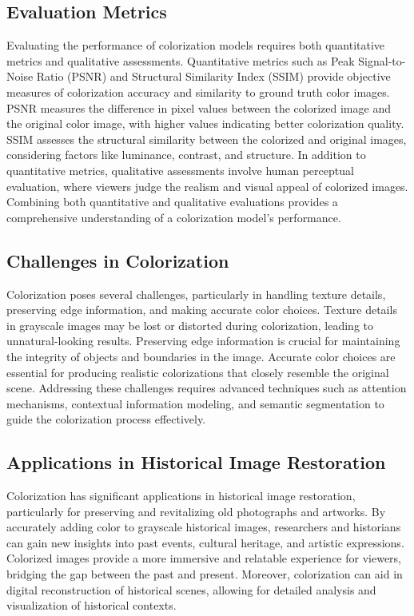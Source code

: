\subsection*{Evaluation Metrics}

Evaluating the performance of colorization models requires both quantitative metrics and qualitative assessments. Quantitative metrics such as Peak Signal-to-Noise Ratio (PSNR) and Structural Similarity Index (SSIM) provide objective measures of colorization accuracy and similarity to ground truth color images. PSNR measures the difference in pixel values between the colorized image and the original color image, with higher values indicating better colorization quality. SSIM assesses the structural similarity between the colorized and original images, considering factors like luminance, contrast, and structure. In addition to quantitative metrics, qualitative assessments involve human perceptual evaluation, where viewers judge the realism and visual appeal of colorized images. Combining both quantitative and qualitative evaluations provides a comprehensive understanding of a colorization model's performance.

\subsection*{Challenges in Colorization}

Colorization poses several challenges, particularly in handling texture details, preserving edge information, and making accurate color choices. Texture details in grayscale images may be lost or distorted during colorization, leading to unnatural-looking results. Preserving edge information is crucial for maintaining the integrity of objects and boundaries in the image. Accurate color choices are essential for producing realistic colorizations that closely resemble the original scene. Addressing these challenges requires advanced techniques such as attention mechanisms, contextual information modeling, and semantic segmentation to guide the colorization process effectively.

\subsection*{Applications in Historical Image Restoration}

Colorization has significant applications in historical image restoration, particularly for preserving and revitalizing old photographs and artworks. By accurately adding color to grayscale historical images, researchers and historians can gain new insights into past events, cultural heritage, and artistic expressions. Colorized images provide a more immersive and relatable experience for viewers, bridging the gap between the past and present. Moreover, colorization can aid in digital reconstruction of historical scenes, allowing for detailed analysis and visualization of historical contexts.

